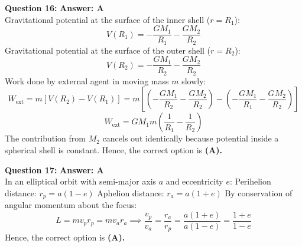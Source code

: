 \documentclass[11pt,a4paper]{article}
\begin{document}
\begin{tcolorbox}[solbox]
  \textbf{\textcolor{primaryDark}{Question 16:}} \hfill \textbf{\textcolor{l3Crimson}{Answer: A}}\\
  \vspace{3pt}
  Gravitational potential at the surface of the inner shell ($r = R_1$):
$$V(R_1) = -\frac{GM_1}{R_1} - \frac{GM_2}{R_2}$$
\vspace{3pt}
Gravitational potential at the surface of the outer shell ($r = R_2$):
$$V(R_2) = -\frac{GM_1}{R_2} - \frac{GM_2}{R_2}$$
\vspace{3pt}
Work done by external agent in moving mass $m$ slowly:
$$W_{\text{ext}} = m [V(R_2) - V(R_1)] = m \left[\left(-\frac{GM_1}{R_2} - \frac{GM_2}{R_2}\right) - \left(-\frac{GM_1}{R_1} - \frac{GM_2}{R_2}\right)\right]$$
$$W_{\text{ext}} = GM_1 m \left(\frac{1}{R_1} - \frac{1}{R_2}\right)$$
\vspace{3pt}
The contribution from $M_2$ cancels out identically because potential inside a spherical shell is constant.
\vspace{3pt}
Hence, the correct option is \textbf{(A)}\textbf{.}
\end{tcolorbox}
\vspace{3pt}

\begin{tcolorbox}[solbox]
  \textbf{\textcolor{primaryDark}{Question 17:}} \hfill \textbf{\textcolor{l3Crimson}{Answer: A}}\\
  \vspace{3pt}
  In an elliptical orbit with semi-major axis $a$ and eccentricity $e$:
Perihelion distance: $r_p = a(1 - e)$
Aphelion distance: $r_a = a(1 + e)$
\vspace{3pt}
By conservation of angular momentum about the focus:
$$L = m v_p r_p = m v_a r_a \implies \frac{v_p}{v_a} = \frac{r_a}{r_p} = \frac{a(1 + e)}{a(1 - e)} = \frac{1 + e}{1 - e}$$
\vspace{3pt}
Hence, the correct option is \textbf{(A)}\textbf{.}
\end{tcolorbox}
\vspace{3pt}
\end{document}
